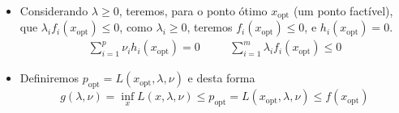 \begin{frame}[allowframebreaks]
\begin{itemize}
  \item Considerando $\lambda \geq 0$, teremos, para o ponto ótimo $x_{\text{opt}}$ (um ponto factível),
	que $\lambda_i f_i (x_{\text{opt}}) \leq 0$, como $\lambda_i \geq 0$, teremos $f_i (x_{\text{opt}}) \leq 0$,
	e $h_i (x_{\text{opt}}) = 0$.
	\begin{equation}
	\begin{aligned}
	\sum_{i=1}^{p} \nu_i h_i (x_{\text{opt}}) = 0 & \quad & \sum_{i=1}^{m} \lambda_i f_i (x_{\text{opt}}) \leq 0
	\end{aligned}
	\end{equation}
  \item Definiremos $p_{\text{opt}} = L(x_{\text{opt}}, \lambda, \nu)$ e desta forma
	\begin{equation}
	g(\lambda, \nu) = \inf_x L(x,\lambda, \nu) \leq p_{\text{opt}} = L(x_{\text{opt}}, \lambda, \nu) \leq f(x_{\text{opt}})
	\end{equation}
  \end{itemize}

\end{frame}



